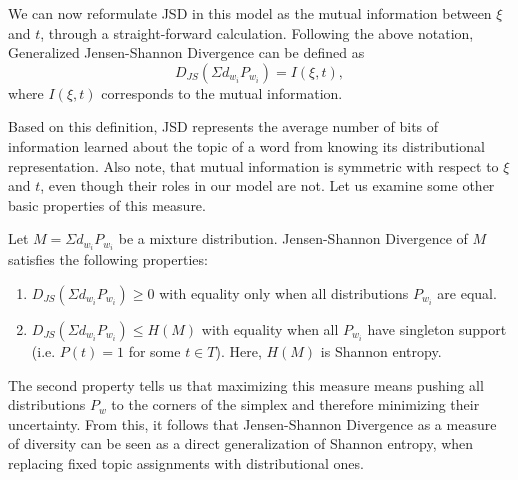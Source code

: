 We can now reformulate JSD in this model as the mutual information
between $\xi$ and $t$, through a straight-forward calculation.
\bep
Following the above notation, Generalized Jensen-Shannon Divergence
can be defined as
\[D_{JS}(\Sigma d_{w_i}P_{w_i})= I(\xi,t),\]
where $I(\xi,t)$ corresponds to the mutual information.
\eep

Based on this definition, JSD represents the average number of bits of
information learned about the topic of a word from knowing its
distributional representation. Also note, that mutual information is
symmetric with respect to $\xi$ and $t$, even though their roles in
our model are not. Let us examine some other basic properties of this
measure. 

\bep\label{jsd-properties}
Let $M=\Sigma d_{w_i} P_{w_i}$ be a mixture distribution. Jensen-Shannon
Divergence of $M$ satisfies the following properties:
 \begin{enumerate}
   \item $D_{JS}(\Sigma d_{w_i}P_{w_i})\geq 0$ with equality only when all
     distributions $P_{w_i}$ are equal.
   \item $D_{JS}(\Sigma d_{w_i}P_{w_i})\leq H(M)$ with equality when all
     $P_{w_i}$ have singleton support (i.e. $P(t)=1$ for some $t\in
     T$). Here, $H(M)$ is Shannon entropy.
 \end{enumerate}
\eep
The second property tells us that maximizing this measure means
pushing all distributions $P_w$ to the corners of the simplex and
therefore minimizing their uncertainty. From this, it follows that
Jensen-Shannon Divergence as a measure of diversity can be seen as a
direct generalization of Shannon entropy, when replacing fixed topic
assignments with distributional ones.  
